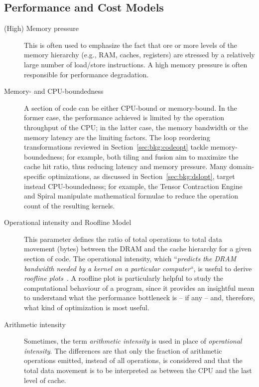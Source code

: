 \subsection*{Performance and Cost Models}
\begin{description}

\item[(High) Memory pressure] This is often used to emphasize the fact that ore or more levels of the memory hierarchy (e.g., RAM, caches, registers) are stressed by a relatively large number of load/store instructions. A high memory pressure is often responsible for performance degradation.

\item[Memory- and CPU-boundedness] A section of code can be either CPU-bound or memory-bound. In the former case, the performance achieved is limited by the operation throughput of the CPU; in the latter case, the memory bandwidth or the memory latency are the limiting factors. The loop reordering transformations reviewed in Section~\ref{sec:bkg:codeopt} tackle memory-boundedness; for example, both tiling and fusion aim to maximize the cache hit ratio, thus reducing latency and memory pressure. Many domain-specific optimizations, as discussed in Section~\ref{sec:bkg:dslopt}, target instead CPU-boundedness; for example, the Tensor Contraction Engine and Spiral manipulate mathematical formulae to reduce the operation count of the resulting kernels.

\item[Operational intensity and Roofline Model] This parameter defines the ratio of total operations to total data movement (bytes) between the DRAM and the cache hierarchy for a given section of code. The operational intensity, which ``{\it predicts the DRAM bandwidth needed by a kernel on a particular computer}``, is useful to derive {\em roofline plots}~\citep{roofline-cite}. A roofline plot is particularly helpful to study the computational behaviour of a program, since it provides an insightful mean to understand what the performance bottleneck is -- if any -- and, therefore, what kind of optimization is most useful. 

\item[Arithmetic intensity] Sometimes, the term {\em arithmetic intensity} is used in place of {\em operational intensity}. The differences are that only the fraction of arithmetic operations emitted, instead of all operations, is considered and that the total data movement is to be interpreted as between the CPU and the last level of cache.
\end{description}

